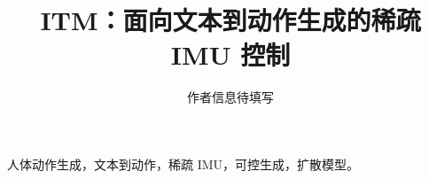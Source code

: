 \documentclass[lettersize,journal]{IEEEtran}
\begin{document}
\title{ITM：面向文本到动作生成的稀疏 IMU 控制}
\author{作者信息待填写}
\maketitle
\begin{abstract}

\end{abstract}
\begin{IEEEkeywords}
人体动作生成，文本到动作，稀疏 IMU，可控生成，扩散模型。
\end{IEEEkeywords}









\end{document}
